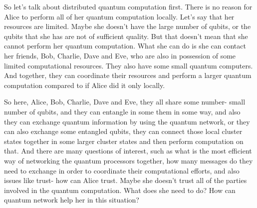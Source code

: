 So let's talk about distributed quantum computation first. There is no reason for Alice to perform all of her quantum computation locally. Let's say that her resources are limited. Maybe she doesn't have the large number of qubits, or the qubits that she has are not of sufficient quality. But that doesn't mean that she cannot perform her quantum computation. What she can do is she can contact her friends, Bob, Charlie, Dave and Eve, who are also in possession of some limited computational resources. They also have some small quantum computers. And together, they can coordinate their resources and perform a larger quantum computation compared to if Alice did it only locally.

So here, Alice, Bob, Charlie, Dave and Eve, they all share some number- small number of qubits, and they can entangle in some them in some way, and also they can exchange quantum information by using the quantum network, or they can also exchange some entangled qubits, they can connect those local cluster states together in some larger cluster states and then perform computation on that. And there are many questions of interest, such as what is the most efficient way of networking the quantum processors together, how many messages do they need to exchange in order to coordinate their computational efforts, and also issues like trust- how can Alice trust. Maybe she doesn't trust all of the parties involved in the quantum computation. What does she need to do? How can quantum network help her in this situation?


